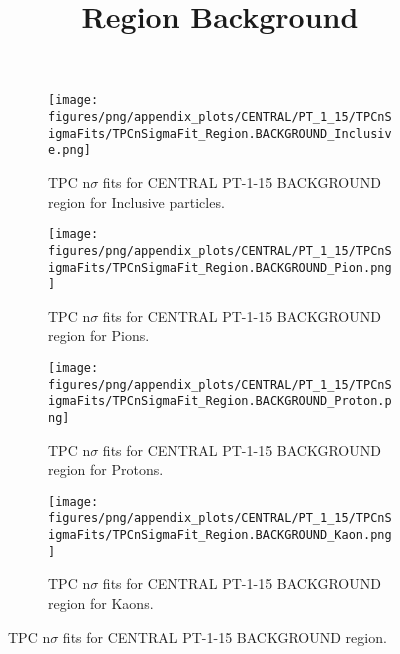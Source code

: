             \begin{figure}[H]
                \title{Region Background}
                \begin{subfigure}[b]{0.5\textwidth}
                    \centering
                    \texttt{[image: figures/png/appendix\_plots/CENTRAL/PT\_1\_15/TPCnSigmaFits/TPCnSigmaFit\_Region.BACKGROUND\_Inclusive.png]}
                    \caption{TPC n$\sigma$ fits for CENTRAL PT-1-15 BACKGROUND region for Inclusive particles.}
                    \label{fig:appendix_CENTRAL_PT-1-15_BACKGROUND_Inclusive}
                \end{subfigure}
                \begin{subfigure}[b]{0.5\textwidth}
                    \centering
                    \texttt{[image: figures/png/appendix\_plots/CENTRAL/PT\_1\_15/TPCnSigmaFits/TPCnSigmaFit\_Region.BACKGROUND\_Pion.png]}
                    \caption{TPC n$\sigma$ fits for CENTRAL PT-1-15 BACKGROUND region for Pions.}
                    \label{fig:appendix_CENTRAL_PT-1-15_BACKGROUND_Pion}
                \end{subfigure}
                \begin{subfigure}[b]{0.5\textwidth}
                    \centering
                    \texttt{[image: figures/png/appendix\_plots/CENTRAL/PT\_1\_15/TPCnSigmaFits/TPCnSigmaFit\_Region.BACKGROUND\_Proton.png]}
                    \caption{TPC n$\sigma$ fits for CENTRAL PT-1-15 BACKGROUND region for Protons.}
                    \label{fig:appendix_CENTRAL_PT-1-15_BACKGROUND_Proton}
                \end{subfigure}
                \begin{subfigure}[b]{0.5\textwidth}
                    \centering
                    \texttt{[image: figures/png/appendix\_plots/CENTRAL/PT\_1\_15/TPCnSigmaFits/TPCnSigmaFit\_Region.BACKGROUND\_Kaon.png]}
                    \caption{TPC n$\sigma$ fits for CENTRAL PT-1-15 BACKGROUND region for Kaons.}
                    \label{fig:appendix_CENTRAL_PT-1-15_BACKGROUND_Kaon}
                \end{subfigure}
                \caption{TPC n$\sigma$ fits for CENTRAL PT-1-15 BACKGROUND region.}
                \label{fig:appendix_CENTRAL_PT-1-15_BACKGROUND}
            \end{figure}
            \clearpage
            
    
